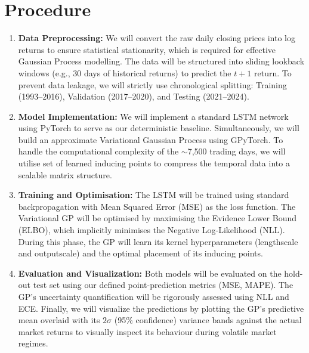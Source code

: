 \documentclass{article}
\begin{document}
\section*{Procedure}
\begin{enumerate}[label=\arabic*.]
    \item \textbf{Data Preprocessing:} We will convert the raw daily closing prices into log returns to ensure statistical stationarity, which is required for effective Gaussian Process modelling. The data will be structured into sliding lookback windows (e.g., 30 days of historical returns) to predict the $t+1$ return. To prevent data leakage, we will strictly use chronological splitting: Training (1993--2016), Validation (2017--2020), and Testing (2021--2024).
    \item \textbf{Model Implementation:} We will implement a standard LSTM network using PyTorch to serve as our deterministic baseline. Simultaneously, we will build an approximate Variational Gaussian Process using GPyTorch. To handle the computational complexity of the $\sim$7,500 trading days, we will utilise set of learned inducing points to compress the temporal data into a scalable matrix structure.
    \item \textbf{Training and Optimisation:} The LSTM will be trained using standard backpropagation with Mean Squared Error (MSE) as the loss function. The Variational GP will be optimised by maximising the Evidence Lower Bound (ELBO), which implicitly minimises the Negative Log-Likelihood (NLL). During this phase, the GP will learn its kernel hyperparameters (lengthscale and outputscale) and the optimal placement of its inducing points.
    \item \textbf{Evaluation and Visualization:} Both models will be evaluated on the hold-out test set using our defined point-prediction metrics (MSE, MAPE). The GP's uncertainty quantification will be rigorously assessed using NLL and ECE. Finally, we will visualize the predictions by plotting the GP's predictive mean overlaid with its $2\sigma$ (95\% confidence) variance bands against the actual market returns to visually inspect its behaviour during volatile market regimes.
\end{enumerate}

\newpage


\end{document}

